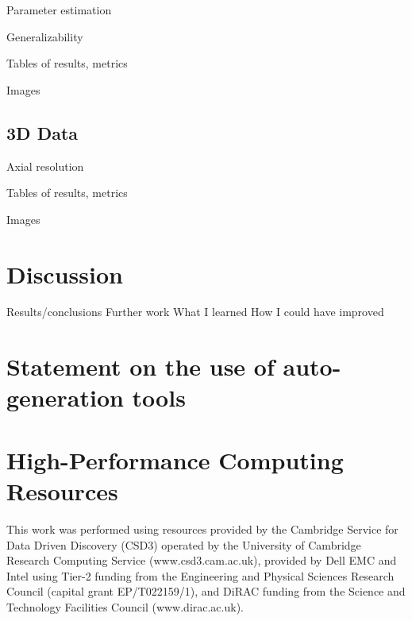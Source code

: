 \documentclass[12pt]{article}
\begin{document}
Parameter estimation

Generalizability

Tables of results, metrics

Images

\subsection{3D Data}

Axial resolution

Tables of results, metrics

Images

\section{Discussion}
Results/conclusions
Further work
What I learned
How I could have improved




\appendix

\section{Statement on the use of auto-generation tools}

\section {High-Performance Computing Resources}

This work was performed using resources provided by the Cambridge Service for Data Driven Discovery (CSD3) operated by the University of Cambridge Research Computing Service (www.csd3.cam.ac.uk),
provided by Dell EMC and Intel using Tier-2 funding from the Engineering and Physical Sciences Research Council (capital grant EP/T022159/1),
and DiRAC funding from the Science and Technology Facilities Council (www.dirac.ac.uk).
\end{document}
